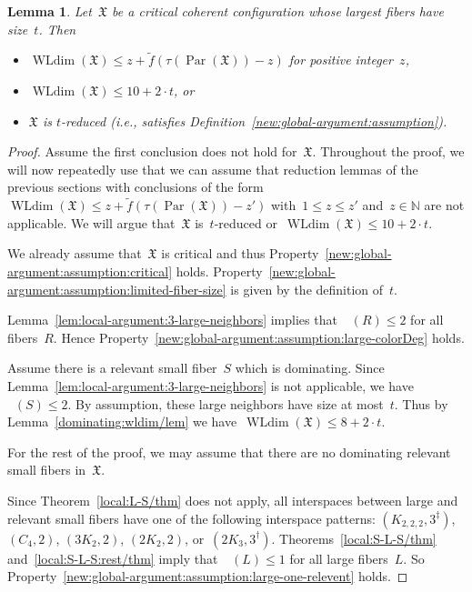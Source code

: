 \documentclass[english,a4paper]{article}
\theoremstyle{plain}
\newtheorem{lemma}      [theorem]{Lemma}
\theoremstyle{definition}
\newcommand{\Nat}{\ensuremath{\mathbb{N}}}
\newcommand{\coherentConfig}{\ensuremath{\mathfrak{X}}}
\DeclareMathOperator*{\WLdim}{WLdim}
\newcommand{\wldim}[1]{\ensuremath{\WLdim\left(#1\right)}}
\DeclareMathOperator{\ColorDegLarge}{cdeg_L}
\DeclareMathOperator{\ColorDegRelevantSmall}{cdeg_{rS}}
\newcommand{\colorDegLarge}[1]{\ensuremath{\ColorDegLarge\left(#1\right)}}
\newcommand{\colorDegRelevantSmall}[1]{\ensuremath{\ColorDegRelevantSmall\left(#1\right)}}
\newcommand{\f}{f}
\DeclareMathOperator{\parameters}{Par}
\newcommand{\ipfourMatching}{\ensuremath{(\disjointCliques{2}{2},2)}}
\newcommand{\ipfourCycle}   {\ensuremath{(\cycle{4},2)}}
\newcommand{\ipsixMatching}             {\ensuremath{(\disjointCliques{3}{2},2)}}
\newcommand{\ipsixTriangle}               {\ensuremath{(\disjointCliques{2}{3},3^\dag)}}
\newcommand{\ipsixMatchingComplementD}{\ensuremath{(\clique{2,2,2},3^\ddag)}}
\newcommand{\clique}[1]{\ensuremath{K_{#1}}}
\newcommand{\cycle}[1]{\ensuremath{C_{#1}}}
\newcommand{\disjointCliques}[2]{\ensuremath{#1 \clique{#2}}}
\begin{document}
\begin{lemma}\label{lem:properties:or:t:reduced}
    Let~$\coherentConfig$ be a critical coherent configuration whose largest fibers have size~$t$.
    Then
    \begin{itemize}
        \item $\wldim{\coherentConfig} \leq z + \widetilde{\f}( \tau(\parameters(\coherentConfig)) - z)$ for positive integer~$z$,
        \item $\wldim{\coherentConfig} \leq 10 + 2\cdot t$, or
        \item $\coherentConfig$ is $t$-reduced (i.e., satisfies Definition~\ref{new:global-argument:assumption}).
    \end{itemize}
\end{lemma}
\begin{proof}
    Assume the first conclusion does not hold for~$\coherentConfig$.
    Throughout the proof, we will now repeatedly use that we can assume that reduction lemmas of the previous sections with conclusions of the form $\wldim{\coherentConfig} \leq z + \widetilde{\f}( \tau(\parameters(\coherentConfig)) - z')$ with~$1\leq z\leq z'$ and~$z\in \Nat$ are not applicable.
    We will argue that~$\coherentConfig$ is~$t$-reduced or~$\wldim{\coherentConfig} \leq 10 + 2\cdot t$.

    We already assume that~$\coherentConfig$ is critical and thus Property~\ref{new:global-argument:assumption:critical} holds.
    Property~\ref{new:global-argument:assumption:limited-fiber-size} is given by the definition of~$t$.

    Lemma~\ref{lem:local-argument:3-large-neighbors} implies that~$\colorDegLarge{R} \leq 2$ for all fibers~$R$.
    Hence Property~\ref{new:global-argument:assumption:large-colorDeg} holds.

    Assume there is a relevant small fiber~$S$ which is dominating.
    Since Lemma~\ref{lem:local-argument:3-large-neighbors} is not applicable, we have~$\colorDegLarge{S} \leq 2$.
    By assumption, these large neighbors have size at most~$t$.
    Thus by Lemma~\ref{dominating:wldim/lem} we have~$\wldim{\coherentConfig} \leq 8 +2\cdot t$.

    For the rest of the proof, we may assume that there are no dominating relevant small fibers in~$\coherentConfig$.

    Since Theorem~\ref{local:L-S/thm} does not apply, all interspaces between large and relevant small fibers have one of the following interspace patterns: $\ipsixMatchingComplementD$, $\ipfourCycle$, $\ipsixMatching$, $\ipfourMatching$, or~$\ipsixTriangle$.
    Theorems~\ref{local:S-L-S/thm} and~\ref{local:S-L-S:rest/thm} imply that~$\colorDegRelevantSmall{L} \leq 1$ for all large fibers~$L$.
    So Property~\ref{new:global-argument:assumption:large-one-relevent} holds.


\end{proof}
\end{document}

